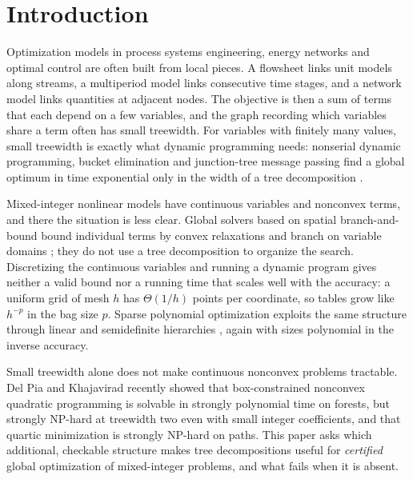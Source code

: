 \section{Introduction}\label{sec:intro}

Optimization models in process systems engineering, energy networks and
optimal control are often built from local pieces. A flowsheet links unit
models along streams, a multiperiod model links consecutive time stages, and a
network model links quantities at adjacent nodes. The objective is then a sum
of terms that each depend on a few variables, and the graph recording which
variables share a term often has small treewidth. For variables with finitely
many values, small treewidth is exactly what dynamic programming needs:
nonserial dynamic programming, bucket elimination and junction-tree message
passing find a global optimum in time exponential only in the width of a tree
decomposition \cite{BerteleBrioschi1972,Dechter1999,KollerFriedman2009}.

Mixed-integer nonlinear models have continuous variables and nonconvex
terms, and there the situation is less clear. Global solvers based on spatial
branch-and-bound bound individual terms by convex relaxations and branch on
variable domains \cite{TawarmalaniSahinidis2005,BelottiEtAl2009,
MisenerFloudas2014,BelottiEtAl2013}; they do not use a tree decomposition to
organize the search. Discretizing the continuous variables and running a
dynamic program gives neither a valid bound nor a running time that scales
well with the accuracy: a uniform grid of mesh $h$ has $\Theta(1/h)$ points per
coordinate, so tables grow like $h^{-p}$ in the bag size $p$. Sparse polynomial
optimization exploits the same structure through linear and semidefinite
hierarchies \cite{WakiEtAl2006,Lasserre2006,BienstockMunoz2018}, again with
sizes polynomial in the inverse accuracy.

Small treewidth alone does not make continuous nonconvex problems
tractable. Del Pia and Khajavirad \cite{DelPiaKhajavirad2026} recently showed
that box-constrained nonconvex quadratic programming is solvable in strongly
polynomial time on forests, but strongly NP-hard at treewidth two even with
small integer coefficients, and that quartic minimization is strongly NP-hard
on paths. This paper asks which additional, checkable structure makes tree
decompositions useful for \emph{certified} global optimization of
mixed-integer problems, and what fails when it is absent.

